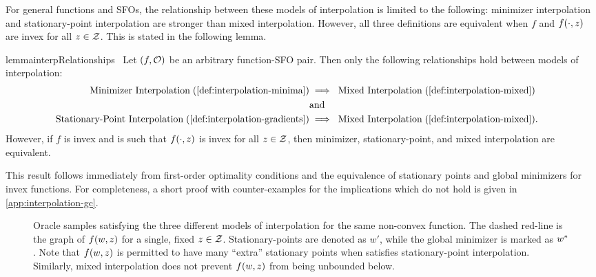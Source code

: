 For general functions and \acp{SFO}, the relationship between these models of interpolation is limited to the following: minimizer interpolation and stationary-point interpolation are stronger than mixed interpolation. 
However, all three definitions are equivalent when \( f \) and \( f(\cdot, \z) \) are invex for all \( z \in \calZ \).
This is stated in the following lemma.
\begin{restatable}{lemma}{interpRelationships}~\label{thm:interp-relationships}
    Let \( \rbr{f, \oracle{}} \) be an arbitrary function-\ac{SFO} pair. 
    Then only the following relationships hold between models of interpolation:
    \begin{align*}
        \text{Minimizer Interpolation} \; (\autoref{def:interpolation-minima}) &\implies \; \text{Mixed Interpolation} \; (\autoref{def:interpolation-mixed})\\
                                                                               & \text{and} &\\
        \text{Stationary-Point Interpolation} \; (\autoref{def:interpolation-gradients}) &\implies \; \text{Mixed Interpolation} \; (\autoref{def:interpolation-mixed}).
    \end{align*}
    However, if \( f \) is invex and \oracle{} is such that \( f(\cdot, \z) \) is invex for all \( \z \in \calZ \), then minimizer, stationary-point, and mixed interpolation are equivalent.
\end{restatable}
\noindent This result follows immediately from first-order optimality conditions and the equivalence of stationary points and global minimizers for invex functions.
For completeness, a short proof with counter-examples for the implications which do not hold is given in \autoref{app:interpolation-gc}.


\begin{figure}[t]
    \centering
    
    \caption[Illustration of oracle samples satisfying different models of interpolation.]%
            {Oracle samples satisfying the three different models of interpolation for the same non-convex function.
             The dashed red-line is the graph of \( f(\w, \z) \) for a single, fixed \( \z \in \calZ \).
             Stationary-points are denoted as \( w' \), while the global minimizer is marked as \( \wopt \).
             Note that \( f(\w, \z) \) is permitted to have many ``extra'' stationary points when \oracle{} satisfies stationary-point interpolation.
         Similarly, mixed interpolation does not prevent \( f(\w, \z) \) from being unbounded below.}%
\label{fig:interpolation-types}
\end{figure}


